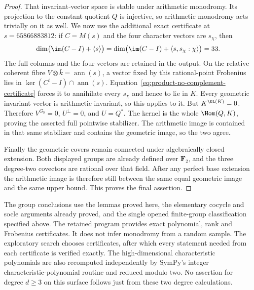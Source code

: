 \begin{proof}
That invariant-vector space is stable under arithmetic monodromy.
Its projection to the constant quotient $Q$ is injective, so
arithmetic monodromy acts trivially on it as well.
We now use the additional exact certificate at $s=65866883812$:
if $C=M(s)$ and the four character vectors are $s_\chi$, then
\begin{equation}\label{eq:product-no-complement-certificate}
 \dim\bigl(\im(C-I)+\langle s\rangle\bigr)
 =\dim\bigl(\im(C-I)+\langle s,s_\chi:\chi\rangle\bigr)=33.
\end{equation}
The full columns and the four vectors are retained in the output.
On the relative coherent fibre $V\otimes\bar k=\operatorname{ann}(s)$,
a vector fixed by this rational-point Frobenius lies in
$\ker(C^t-I)\cap\operatorname{ann}(s)$.
Equation~\eqref{eq:product-no-complement-certificate} forces it
to annihilate every $s_\chi$ and hence to lie in $K$.
Every geometric invariant vector is arithmetic invariant, so this
applies to it.  But $K^{\GL(K)}=0$.  Therefore $V^{G_0}=0$,
$U^\perp=0$, and $U=Q^*$.
The kernel is the whole $\Hom(Q,K)$, proving the asserted full
pointwise stabilizer.  The arithmetic image is contained in that
same stabilizer and contains the geometric image, so the two agree.

Finally the geometric covers remain connected under algebraically
closed extension.  Both displayed groups are already defined over
$\mathbf F_2$, and the three degree-two covectors are rational
over that field.  After any perfect base extension the arithmetic
image is therefore still between the same equal geometric image
and the same upper bound.  This proves the final assertion.
\end{proof}

\begin{remark}
The group conclusions use the lemmas proved here, the elementary
cocycle and socle arguments already proved, and the single opened
finite-group classification specified above.  The retained program
provides exact polynomial, rank and Frobenius certificates.  It does
not infer monodromy from a random sample.  The exploratory search
chooses certificates, after which every statement needed from each
certificate is verified exactly.  The high-dimensional characteristic
polynomials are also recomputed independently by SymPy's integer
characteristic-polynomial routine and reduced modulo two.
No assertion for degree $d\ge3$ on this surface follows just from
these two degree calculations.
\end{remark}
